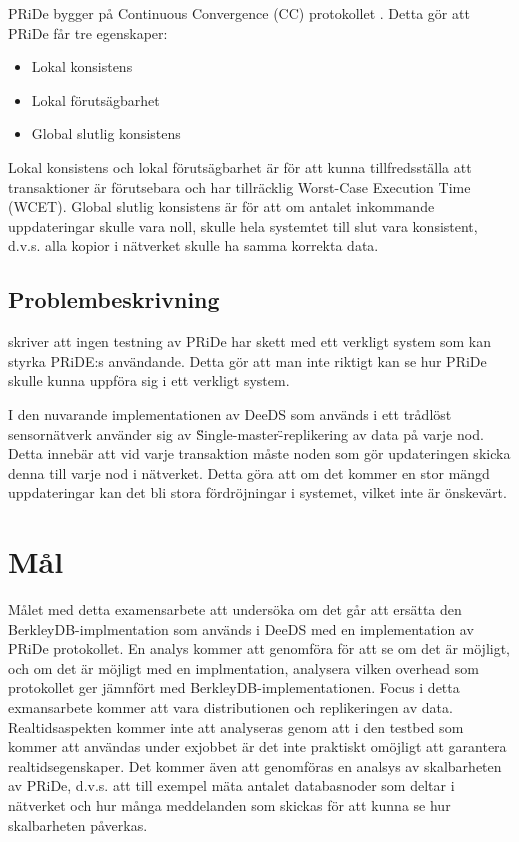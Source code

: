 \documentclass[12pt]{article}
\begin{document}
PRiDe bygger på Continuous Convergence (CC) protokollet \cite[]{Syber2007}. Detta gör att PRiDe får tre egenskaper:

\begin{itemize}
	\item Lokal konsistens
	\item Lokal förutsägbarhet
	\item Global slutlig konsistens
\end{itemize}

Lokal konsistens och lokal förutsägbarhet är för att kunna tillfredsställa att transaktioner är förutsebara och har tillräcklig Worst-Case Execution Time (WCET). Global slutlig konsistens är för att om antalet inkommande uppdateringar skulle vara noll, skulle hela systemtet till slut vara konsistent, d.v.s. alla kopior i nätverket skulle ha samma korrekta data.


\subsection{Problembeskrivning} %
\label{sub:problembeskrivning}

\cite[]{Syber2007} skriver att ingen testning av PRiDe har skett med ett verkligt system som kan styrka PRiDE:s användande. Detta gör att man inte riktigt kan se hur PRiDe skulle kunna uppföra sig i ett verkligt system.

I den nuvarande implementationen av DeeDS som används i ett trådlöst sensornätverk använder sig av \"Single-master\"-replikering av data på varje nod. Detta innebär att vid varje transaktion måste noden som gör updateringen skicka denna till varje nod i nätverket. Detta göra att om det kommer en stor mängd uppdateringar kan det bli stora fördröjningar i systemet, vilket inte är önskevärt.  

\newpage 

\section {Mål}

Målet med detta examensarbete att undersöka om det går att ersätta den BerkleyDB-implmentation som används i DeeDS med en implementation av PRiDe protokollet. En analys kommer att genomföra för att se om det är möjligt, och om det är möjligt med en implmentation, analysera vilken overhead som protokollet ger jämnfört med BerkleyDB-implementationen. Focus i detta exmansarbete kommer att vara distributionen och replikeringen av data. Realtidsaspekten kommer inte att analyseras genom att i den testbed som kommer att användas under exjobbet är det inte praktiskt omöjligt att garantera realtidsegenskaper. Det kommer även att genomföras en analsys av skalbarheten av PRiDe, d.v.s. att till exempel mäta antalet databasnoder som deltar i nätverket och hur många meddelanden som skickas för att kunna se hur skalbarheten påverkas. 
\end{document}
